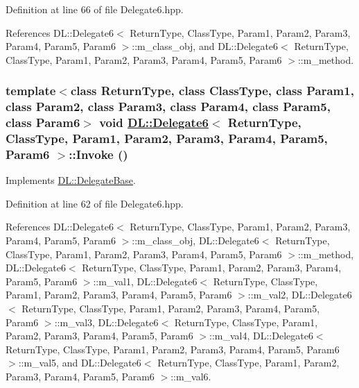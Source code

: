 Definition at line 66 of file Delegate6.hpp.

References DL::Delegate6$<$ Return\-Type, Class\-Type, Param1, Param2, Param3, Param4, Param5, Param6 $>$::m\_\-class\_\-obj, and DL::Delegate6$<$ Return\-Type, Class\-Type, Param1, Param2, Param3, Param4, Param5, Param6 $>$::m\_\-method.\hypertarget{classDL_1_1Delegate6_a2}{
\subsubsection[Invoke]{\setlength{\rightskip}{0pt plus 5cm}template$<$class Return\-Type, class Class\-Type, class Param1, class Param2, class Param3, class Param4, class Param5, class Param6$>$ void \hyperlink{classDL_1_1Delegate6}{DL::Delegate6}$<$ Return\-Type, Class\-Type, Param1, Param2, Param3, Param4, Param5, Param6 $>$::Invoke ()}}
\label{classDL_1_1Delegate6_a2}




Implements \hyperlink{classDL_1_1DelegateBase_a2}{DL::Delegate\-Base}.

Definition at line 62 of file Delegate6.hpp.

References DL::Delegate6$<$ Return\-Type, Class\-Type, Param1, Param2, Param3, Param4, Param5, Param6 $>$::m\_\-class\_\-obj, DL::Delegate6$<$ Return\-Type, Class\-Type, Param1, Param2, Param3, Param4, Param5, Param6 $>$::m\_\-method, DL::Delegate6$<$ Return\-Type, Class\-Type, Param1, Param2, Param3, Param4, Param5, Param6 $>$::m\_\-val1, DL::Delegate6$<$ Return\-Type, Class\-Type, Param1, Param2, Param3, Param4, Param5, Param6 $>$::m\_\-val2, DL::Delegate6$<$ Return\-Type, Class\-Type, Param1, Param2, Param3, Param4, Param5, Param6 $>$::m\_\-val3, DL::Delegate6$<$ Return\-Type, Class\-Type, Param1, Param2, Param3, Param4, Param5, Param6 $>$::m\_\-val4, DL::Delegate6$<$ Return\-Type, Class\-Type, Param1, Param2, Param3, Param4, Param5, Param6 $>$::m\_\-val5, and DL::Delegate6$<$ Return\-Type, Class\-Type, Param1, Param2, Param3, Param4, Param5, Param6 $>$::m\_\-val6.


